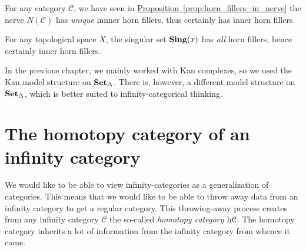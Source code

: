 \documentclass[main.tex]{subfiles}
\begin{document}
\begin{example}
  \label{eg:nerve_of_category_is_infinity_category}
  For any category $\mathcal{C}$, we have seen in \hyperref[prop:horn_fillers_in_nerve]{Proposition~\ref*{prop:horn_fillers_in_nerve}} the nerve $N(\mathcal{C})$ has \emph{unique} innner horn fillers, thus certainly has inner horn fillers.
\end{example}

\begin{example}
  \label{eg:singular_set_of_topological_space_is_infinity_categeory}
  For any topological space $X$, the singular set $\mathbf{Sing}(x)$ has \emph{all} horn fillers, hence certainly inner horn fillers.
\end{example}

In the previous chapter, we mainly worked with Kan complexes, so we used the Kan model structure on $\operatorname{\mathbf{Set}_{\Delta}}$. There is, however, a different model structure on $\operatorname{\mathbf{Set}_{\Delta}}$, which is better suited to infinity-categorical thinking.

\section{The homotopy category of an infinity category}
\label{sec:the_homotopy_category_of_an_infinity_category}

We would like to be able to view infinity-categories as a generalization of categories. This means that we would like to be able to throw away data from an infinity category to get a regular category. This throwing-away process creates from any infinity category $\mathcal{C}$ the so-called \emph{homotopy category} $\mathrm{h} \mathcal{C}$. The homotopy category inherits a lot of information from the infinity category from whence it came.
\end{document}
